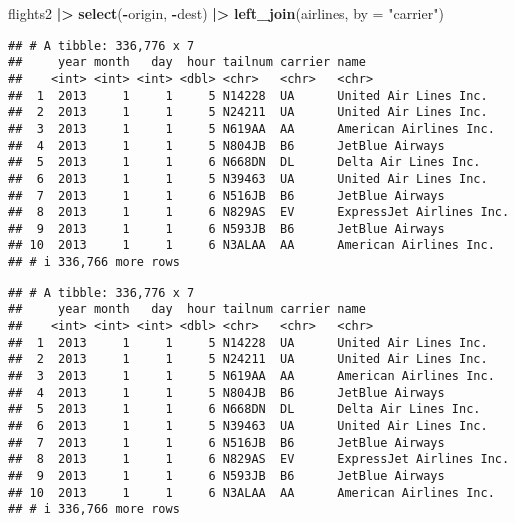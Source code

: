 \documentclass[
]{article}
\newenvironment{Shaded}{\begin{snugshade}}{\end{snugshade}}
\newcommand{\AttributeTok}[1]{\textcolor[rgb]{0.13,0.29,0.53}{#1}}
\newcommand{\FunctionTok}[1]{\textcolor[rgb]{0.13,0.29,0.53}{\textbf{#1}}}
\newcommand{\NormalTok}[1]{#1}
\newcommand{\SpecialCharTok}[1]{\textcolor[rgb]{0.81,0.36,0.00}{\textbf{#1}}}
\newcommand{\StringTok}[1]{\textcolor[rgb]{0.31,0.60,0.02}{#1}}
\begin{document}
\begin{Shaded}
\begin{Highlighting}[]
\NormalTok{flights2 }\SpecialCharTok{|\textgreater{}}
  \FunctionTok{select}\NormalTok{(}\SpecialCharTok{{-}}\NormalTok{origin, }\SpecialCharTok{{-}}\NormalTok{dest) }\SpecialCharTok{|\textgreater{}}
  \FunctionTok{left\_join}\NormalTok{(airlines, }\AttributeTok{by =} \StringTok{"carrier"}\NormalTok{)}
\end{Highlighting}
\end{Shaded}

\begin{verbatim}
## # A tibble: 336,776 x 7
##     year month   day  hour tailnum carrier name                    
##    <int> <int> <int> <dbl> <chr>   <chr>   <chr>                   
##  1  2013     1     1     5 N14228  UA      United Air Lines Inc.   
##  2  2013     1     1     5 N24211  UA      United Air Lines Inc.   
##  3  2013     1     1     5 N619AA  AA      American Airlines Inc.  
##  4  2013     1     1     5 N804JB  B6      JetBlue Airways         
##  5  2013     1     1     6 N668DN  DL      Delta Air Lines Inc.    
##  6  2013     1     1     5 N39463  UA      United Air Lines Inc.   
##  7  2013     1     1     6 N516JB  B6      JetBlue Airways         
##  8  2013     1     1     6 N829AS  EV      ExpressJet Airlines Inc.
##  9  2013     1     1     6 N593JB  B6      JetBlue Airways         
## 10  2013     1     1     6 N3ALAA  AA      American Airlines Inc.  
## # i 336,766 more rows
\end{verbatim}

\begin{Shaded}
\end{Shaded}

\begin{verbatim}
## # A tibble: 336,776 x 7
##     year month   day  hour tailnum carrier name                    
##    <int> <int> <int> <dbl> <chr>   <chr>   <chr>                   
##  1  2013     1     1     5 N14228  UA      United Air Lines Inc.   
##  2  2013     1     1     5 N24211  UA      United Air Lines Inc.   
##  3  2013     1     1     5 N619AA  AA      American Airlines Inc.  
##  4  2013     1     1     5 N804JB  B6      JetBlue Airways         
##  5  2013     1     1     6 N668DN  DL      Delta Air Lines Inc.    
##  6  2013     1     1     5 N39463  UA      United Air Lines Inc.   
##  7  2013     1     1     6 N516JB  B6      JetBlue Airways         
##  8  2013     1     1     6 N829AS  EV      ExpressJet Airlines Inc.
##  9  2013     1     1     6 N593JB  B6      JetBlue Airways         
## 10  2013     1     1     6 N3ALAA  AA      American Airlines Inc.  
## # i 336,766 more rows
\end{verbatim}
\end{document}

